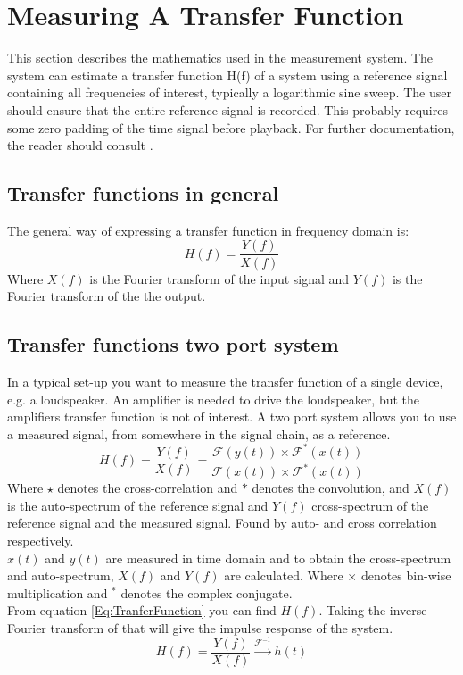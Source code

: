 \section{Measuring A Transfer Function}\label{Sec:MeasATransFunc}
This section describes the mathematics used in the measurement system. The system can estimate a transfer function H(f) of a system using a reference signal containing all frequencies of interest, typically  a logarithmic sine sweep. The user should ensure that the entire reference signal is recorded. This probably requires some zero padding of the time signal before playback. For further documentation, the reader should consult \cite{TutorialMeasurementPowerSpectra}.
\subsection{Transfer functions in general}
The general way of expressing a transfer function in frequency domain is:
\begin{equation}
H(f)=\frac{Y(f)}{X(f)}
\label{Eq:TranferFunction}
\end{equation}
Where $X(f)$ is the Fourier transform of the input signal and $Y(f)$ is the Fourier transform of the the output.  

\subsection{Transfer functions two port system}
In a typical set-up you want to measure the transfer function of a single device, e.g. a loudspeaker. An amplifier is needed to drive the loudspeaker, but the amplifiers transfer function is not of interest. A two port system allows you to use a measured signal, from somewhere in the signal chain, as a reference. 
\begin{equation}
H(f)=\frac{Y(f)}{X(f)}=\frac{\mathscr{F}(y(t))\times\mathscr{F}^{\ast}(x(t))}{\mathscr{F}(x(t))\times\mathscr{F}^{\ast}(x(t))}
\label{Eq:TranferFunctionTwoPort}
\end{equation}
Where $\star $ denotes the cross-correlation and $\ast $ denotes the convolution, and 
 $X(f)$ is the auto-spectrum of the reference signal and $Y(f)$ cross-spectrum of the reference signal and the measured signal. Found by auto- and cross correlation respectively.\\
$x(t)$ and $y(t)$ are measured in time domain and to obtain the cross-spectrum and auto-spectrum, $X(f)$ and $Y(f)$ are calculated.
Where $\times$ denotes bin-wise multiplication and $^{\ast}$ denotes the complex conjugate. \\
From equation \ref{Eq:TranferFunction} %
you can find $H(f)$. Taking the inverse Fourier transform of that will give the impulse response of the system. 
\begin{equation}
H(f) = \frac{Y(f)}{X(f)} \xrightarrow{\mathscr{F}^{-1}} h(t)
\label{Eq:Impulseresponse}
\end{equation} 

